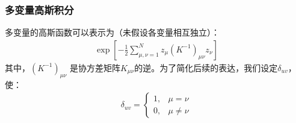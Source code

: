 \subsubsection{多变量高斯积分}
多变量的高斯函数可以表示为（未假设各变量相互独立）：
\begin{equation}
    \begin{split}
    \exp{
        \left[
            - \frac{1}{2}
            \sum_{\mu,\nu=1}^N
            {z_{\mu}(K^{-1})_{\mu\nu}z_{\nu}}
        \right]
    }
    \end{split}
\end{equation}
其中，$(K^{-1})_{\mu\nu}$ 是协方差矩阵$K_{\mu\nu}$的逆。为了简化后续的表达，我们设定$\delta_{uv}$，使：
\begin{equation}
    \begin{split}
        \delta_{uv} =
         \left\{
            \begin{matrix}
            1, & \mu = \nu\\ 
            0, & \mu \neq \nu
            \end{matrix}
        \right.
    \end{split}
\end{equation}

